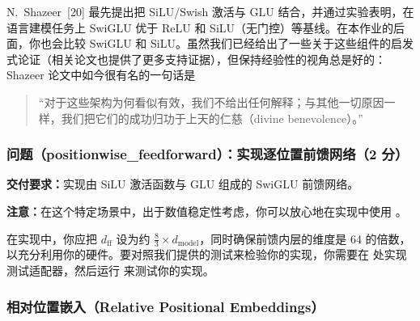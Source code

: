 N.~Shazeer~[20] 最先提出把 SiLU/Swish 激活与 GLU 结合，并通过实验表明，在语言建模任务上 SwiGLU 优于 ReLU 和 SiLU（无门控）等基线。在本作业的后面，你也会比较 SwiGLU 和 SiLU。虽然我们已经给出了一些关于这些组件的启发式论证（相关论文也提供了更多支持证据），但保持经验性的视角总是好的：Shazeer 论文中如今很有名的一句话是

\begin{quote}
``对于这些架构为何看似有效，我们不给出任何解释；与其他一切原因一样，我们把它们的成功归功于上天的仁慈（divine benevolence）。''
\end{quote}

\subsubsection*{问题（positionwise\_feedforward）：实现逐位置前馈网络（2 分）}

\textbf{交付要求：}实现由 SiLU 激活函数与 GLU 组成的 SwiGLU 前馈网络。

\textbf{注意：}在这个特定场景中，出于数值稳定性考虑，你可以放心地在实现中使用 。

在实现中，你应把 $d_{\mathrm{ff}}$ 设为约 $\tfrac{8}{3} \times d_{\mathrm{model}}$，同时确保前馈内层的维度是 64 的倍数，以充分利用你的硬件。要对照我们提供的测试来检验你的实现，你需要在  处实现测试适配器，然后运行  来测试你的实现。

\subsubsection{相对位置嵌入（Relative Positional Embeddings）}

